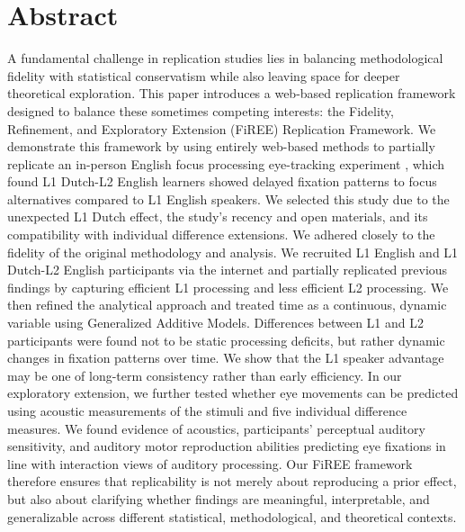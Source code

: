 \section{Abstract}
A fundamental challenge in replication studies lies in balancing methodological fidelity with statistical conservatism while also leaving space for deeper theoretical exploration. This paper introduces a web-based replication framework designed to balance these sometimes competing interests: the Fidelity, Refinement, and Exploratory Extension (FiREE) Replication Framework. We demonstrate this framework by using entirely web-based methods to partially replicate an in-person English focus processing eye-tracking experiment \parencite{ge2021a}, which found L1 Dutch-L2 English learners showed delayed fixation patterns to focus alternatives compared to L1 English speakers. We selected this study due to the unexpected L1 Dutch effect, the study's recency and open materials, and its compatibility with individual difference extensions. We adhered closely to the fidelity of the original methodology and analysis. We recruited L1 English and L1 Dutch-L2 English participants via the internet and partially replicated previous findings by capturing efficient L1 processing and less efficient L2 processing. We then refined the analytical approach and treated time as a continuous, dynamic variable using Generalized Additive Models. Differences between L1 and L2 participants were found not to be static processing deficits, but rather dynamic changes in fixation patterns over time. We show that the L1 speaker advantage may be one of long-term consistency rather than early efficiency. In our exploratory extension, we further tested whether eye movements can be predicted using acoustic measurements of the stimuli and five individual difference measures. We found evidence of acoustics, participants' perceptual auditory sensitivity, and auditory motor reproduction abilities predicting eye fixations in line with interaction views of auditory processing. Our FiREE framework therefore ensures that replicability is not merely about reproducing a prior effect, but also about clarifying whether findings are meaningful, interpretable, and generalizable across different statistical, methodological, and theoretical contexts.

